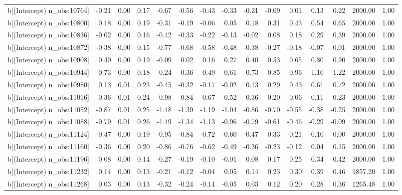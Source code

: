 \begin{table}[ht]
\begin{tabular}{rrrrrrrrrrrrrrr}
  b[(Intercept) n\_obs:10764] & -0.21 & 0.00 & 0.17 & -0.67 & -0.56 & -0.43 & -0.33 & -0.21 & -0.09 & 0.01 & 0.13 & 0.22 & 2000.00 & 1.00 \\ 
  b[(Intercept) n\_obs:10800] & 0.18 & 0.00 & 0.19 & -0.31 & -0.19 & -0.06 & 0.05 & 0.18 & 0.31 & 0.43 & 0.54 & 0.65 & 2000.00 & 1.00 \\ 
  b[(Intercept) n\_obs:10836] & -0.02 & 0.00 & 0.16 & -0.42 & -0.33 & -0.22 & -0.13 & -0.02 & 0.08 & 0.18 & 0.29 & 0.39 & 2000.00 & 1.00 \\ 
  b[(Intercept) n\_obs:10872] & -0.38 & 0.00 & 0.15 & -0.77 & -0.68 & -0.58 & -0.48 & -0.38 & -0.27 & -0.18 & -0.07 & 0.01 & 2000.00 & 1.00 \\ 
  b[(Intercept) n\_obs:10908] & 0.40 & 0.00 & 0.19 & -0.09 & 0.02 & 0.16 & 0.27 & 0.40 & 0.53 & 0.65 & 0.80 & 0.90 & 2000.00 & 1.00 \\ 
  b[(Intercept) n\_obs:10944] & 0.73 & 0.00 & 0.18 & 0.24 & 0.36 & 0.49 & 0.61 & 0.73 & 0.85 & 0.96 & 1.10 & 1.22 & 2000.00 & 1.00 \\ 
  b[(Intercept) n\_obs:10980] & 0.13 & 0.01 & 0.23 & -0.45 & -0.32 & -0.17 & -0.02 & 0.13 & 0.29 & 0.43 & 0.61 & 0.72 & 2000.00 & 1.00 \\ 
  b[(Intercept) n\_obs:11016] & -0.36 & 0.01 & 0.24 & -0.98 & -0.84 & -0.67 & -0.52 & -0.36 & -0.20 & -0.06 & 0.11 & 0.23 & 2000.00 & 1.00 \\ 
  b[(Intercept) n\_obs:11052] & -0.87 & 0.01 & 0.25 & -1.48 & -1.39 & -1.19 & -1.04 & -0.86 & -0.70 & -0.55 & -0.38 & -0.25 & 2000.00 & 1.00 \\ 
  b[(Intercept) n\_obs:11088] & -0.79 & 0.01 & 0.26 & -1.49 & -1.34 & -1.13 & -0.96 & -0.79 & -0.61 & -0.46 & -0.29 & -0.09 & 2000.00 & 1.00 \\ 
  b[(Intercept) n\_obs:11124] & -0.47 & 0.00 & 0.19 & -0.95 & -0.84 & -0.72 & -0.60 & -0.47 & -0.33 & -0.21 & -0.10 & 0.00 & 2000.00 & 1.00 \\ 
  b[(Intercept) n\_obs:11160] & -0.36 & 0.00 & 0.20 & -0.86 & -0.76 & -0.62 & -0.49 & -0.36 & -0.23 & -0.12 & 0.04 & 0.15 & 2000.00 & 1.00 \\ 
  b[(Intercept) n\_obs:11196] & 0.08 & 0.00 & 0.14 & -0.27 & -0.19 & -0.10 & -0.01 & 0.08 & 0.17 & 0.25 & 0.34 & 0.42 & 2000.00 & 1.00 \\ 
  b[(Intercept) n\_obs:11232] & 0.14 & 0.00 & 0.13 & -0.21 & -0.12 & -0.04 & 0.05 & 0.14 & 0.23 & 0.30 & 0.39 & 0.46 & 1857.20 & 1.00 \\ 
  b[(Intercept) n\_obs:11268] & 0.03 & 0.00 & 0.13 & -0.32 & -0.24 & -0.14 & -0.05 & 0.03 & 0.12 & 0.20 & 0.28 & 0.36 & 1265.48 & 1.00 \\ 

\end{tabular}
\end{table}
